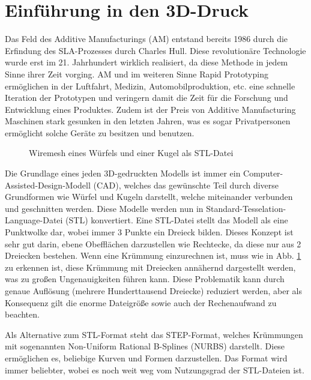 \documentclass[main.tex]{subfiles}
\begin{document}
\section{Einführung in den 3D-Druck}

Das Feld des Additive Manufacturings (AM) entstand bereits 1986 durch die Erfindung des SLA-Prozesses durch Charles Hull. 
Diese revolutionäre Technologie wurde erst im 21. Jahrhundert wirklich realisiert, da diese Methode in jedem Sinne ihrer Zeit vorging. AM und im weiteren Sinne Rapid Prototyping ermöglichen in der Luftfahrt, Medizin, Automobilproduktion, etc. eine schnelle Iteration der Prototypen und veringern damit die Zeit für die Forschung und Entwicklung eines Produktes. 
Zudem ist der Preis von Additive Manufacturing Maschinen stark gesunken in den letzten Jahren, was es sogar Privatpersonen ermöglicht solche Geräte zu besitzen und benutzen. \parencite{BHATIA20231060}
\begin{figure}[h!]
\begin{center}
	\caption{Wiremesh eines Würfels und einer Kugel als STL-Datei}
	\label{img:stl_1}
\end{center}
\end{figure}	

Die Grundlage eines jeden 3D-gedruckten Modells ist immer ein Computer-Assisted-Design-Modell (CAD), welches das gewünschte Teil durch diverse Grundformen wie Würfel und Kugeln darstellt, welche miteinander verbunden und geschnitten werden. Diese Modelle werden nun in Standard-Tesselation-Language-Datei (STL) konvertiert. Eine STL-Datei stellt das Modell als eine Punktwolke dar, wobei immer 3 Punkte ein Dreieck bilden.
Dieses Konzept ist sehr gut darin, ebene Obefflächen darzustellen wie Rechtecke, da diese nur aus 2 Dreiecken bestehen. Wenn eine Krümmung einzurechnen ist, muss wie in Abb. \ref{img:stl_1} zu erkennen ist, diese Krümmung mit Dreiecken annähernd dargestellt werden, was zu großen Ungenauigkeiten führen kann. Diese Problematik kann durch genaue Auflösung (mehrere Hunderttausend Dreiecke) reduziert werden, aber als Konsequenz gilt die enorme Dateigröße sowie auch der Rechenaufwand zu beachten. \parencite{ADOBLESTL} 

Als Alternative zum STL-Format steht das STEP-Format, welches Krümmungen mit sogenannten Non-Uniform Rational B-Splines (NURBS) darstellt.
Diese ermöglichen es, beliebige Kurven und Formen darzustellen. Das Format wird immer beliebter, wobei es noch weit weg vom Nutzungsgrad der STL-Dateien ist. \parencite{ADOBESTEP}
\end{document}
